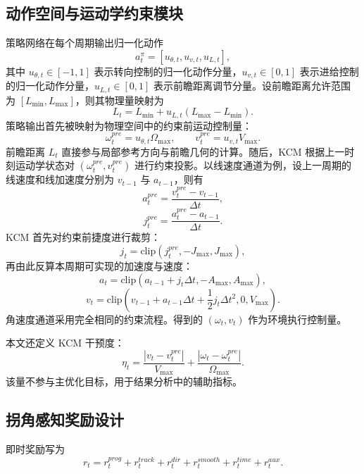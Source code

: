 \documentclass[preprint,12pt]{elsarticle}
\begin{document}
\subsection{动作空间与运动学约束模块}
策略网络在每个周期输出归一化动作
\begin{equation}
 a_t^{\pi}=[u_{\theta,t},u_{v,t},u_{L,t}],
\end{equation}
其中 $u_{\theta,t}\in[-1,1]$ 表示转向控制的归一化动作分量，$u_{v,t}\in[0,1]$ 表示进给控制的归一化动作分量，$u_{L,t}\in[0,1]$ 表示前瞻距离调节分量。设前瞻距离允许范围为 $[L_{\min},L_{\max}]$，则其物理量映射为
\begin{equation}
L_t=L_{\min}+u_{L,t}(L_{\max}-L_{\min}).
\end{equation}
策略输出首先被映射为物理空间中的约束前运动控制量：
\begin{equation}
\omega_t^{pre}=u_{\theta,t}\Omega_{\max},\qquad v_t^{pre}=u_{v,t}V_{\max}.
\end{equation}
前瞻距离 $L_t$ 直接参与局部参考方向与前瞻几何的计算。随后，KCM 根据上一时刻运动学状态对 $(\omega_t^{pre},v_t^{pre})$ 进行约束投影。以线速度通道为例，设上一周期的线速度和线加速度分别为 $v_{t-1}$ 与 $a_{t-1}$，则有
\begin{equation}
 a_t^{pre}=\frac{v_t^{pre}-v_{t-1}}{\Delta t},
\end{equation}
\begin{equation}
 j_t^{pre}=\frac{a_t^{pre}-a_{t-1}}{\Delta t}.
\end{equation}
KCM 首先对约束前捷度进行裁剪：
\begin{equation}
 j_t=\mathrm{clip}(j_t^{pre},-J_{\max},J_{\max}),
\end{equation}
再由此反算本周期可实现的加速度与速度：
\begin{equation}
 a_t=\mathrm{clip}(a_{t-1}+j_t\Delta t,-A_{\max},A_{\max}),
\end{equation}
\begin{equation}
 v_t=\mathrm{clip}\left(v_{t-1}+a_{t-1}\Delta t+\frac{1}{2}j_t\Delta t^2,0,V_{\max}\right).
\end{equation}
角速度通道采用完全相同的约束流程。得到的 $(\omega_t,v_t)$ 作为环境执行控制量。

本文还定义 KCM 干预度：
\begin{equation}
\eta_t=\frac{|v_t-v_t^{pre}|}{V_{\max}}+\frac{|\omega_t-\omega_t^{pre}|}{\Omega_{\max}}.
\end{equation}
该量不参与主优化目标，用于结果分析中的辅助指标。

\subsection{拐角感知奖励设计}
即时奖励写为
\begin{equation}
 r_t=r_t^{prog}+r_t^{track}+r_t^{dir}+r_t^{smooth}+r_t^{time}+r_t^{aux}.
\label{eq:reward_total}
\end{equation}
\end{document}
